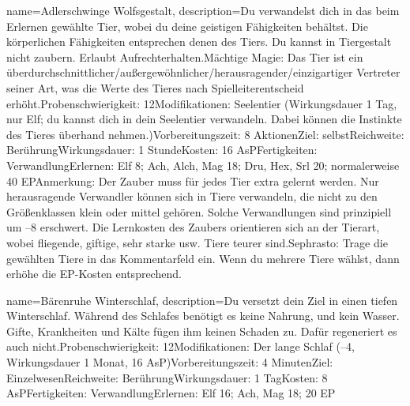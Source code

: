 {
    name={Adlerschwinge Wolfsgestalt},
    description={Du verwandelst dich in das beim Erlernen gewählte Tier, wobei du deine geistigen Fähigkeiten behältst. Die körperlichen Fähigkeiten entsprechen denen des Tiers. Du kannst in Tiergestalt nicht zaubern. Erlaubt Aufrechterhalten.\newline Mächtige Magie: Das Tier ist ein überdurchschnittlicher/außergewöhnlicher/herausragender/einzigartiger Vertreter seiner Art, was die Werte des Tieres nach Spielleiterentscheid erhöht.\newline Probenschwierigkeit: 12\newline Modifikationen: Seelentier (Wirkungsdauer 1 Tag, nur Elf; du kannst dich in dein Seelentier verwandeln. Dabei können die Instinkte des Tieres überhand nehmen.)\newline Vorbereitungszeit: 8 Aktionen\newline Ziel: selbst\newline Reichweite: Berührung\newline Wirkungsdauer: 1 Stunde\newline Kosten: 16 AsP\newline Fertigkeiten: Verwandlung\newline Erlernen: Elf 8; Ach, Alch, Mag 18; Dru, Hex, Srl 20; normalerweise 40 EP\newline Anmerkung: Der Zauber muss für jedes Tier extra gelernt werden. Nur herausragende Verwandler können sich in Tiere verwandeln, die nicht zu den Größenklassen klein oder mittel gehören. Solche Verwandlungen sind prinzipiell um –8 erschwert. Die Lernkosten des Zaubers orientieren sich an der Tierart, wobei fliegende, giftige, sehr starke usw. Tiere teurer sind.\newline Sephrasto: Trage die gewählten Tiere in das Kommentarfeld ein. Wenn du mehrere Tiere wählst, dann erhöhe die EP-Kosten entsprechend.}
}


{
    name={Bärenruhe Winterschlaf},
    description={Du versetzt dein Ziel in einen tiefen Winterschlaf. Während des Schlafes benötigt es keine Nahrung, und kein Wasser. Gifte, Krankheiten und Kälte fügen ihm keinen Schaden zu. Dafür regeneriert es auch nicht.\newline Probenschwierigkeit: 12\newline Modifikationen: Der lange Schlaf (–4, Wirkungsdauer 1 Monat, 16 AsP)\newline Vorbereitungszeit: 4 Minuten\newline Ziel: Einzelwesen\newline Reichweite: Berührung\newline Wirkungsdauer: 1 Tag\newline Kosten: 8 AsP\newline Fertigkeiten: Verwandlung\newline Erlernen: Elf 16; Ach, Mag 18; 20 EP}
}


